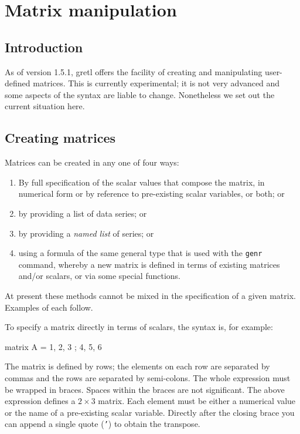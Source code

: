 \chapter{Matrix manipulation}
\label{chap-matrices}

\section{Introduction}
\label{matrix-intro}

As of version 1.5.1, gretl offers the facility of creating and
manipulating user-defined matrices.  This is currently experimental;
it is not very advanced and some aspects of the syntax are liable to
change.  Nonetheless we set out the current situation here.

\section{Creating matrices}
\label{matrix-create}

Matrices can be created in any one of four ways:

\begin{enumerate}
\item By full specification of the scalar values that compose the
  matrix, in numerical form or by reference to pre-existing
  scalar variables, or both; or
\item by providing a list of data series; or
\item by providing a \textit{named list} of series; or
\item using a formula of the same general type that is used
  with the \texttt{genr} command, whereby a new matrix is defined
  in terms of existing matrices and/or scalars, or via some
  special functions.
\end{enumerate}

At present these methods cannot be mixed in the specification of a
given matrix.  Examples of each follow.

To specify a matrix directly in terms of scalars, the syntax is,
for example: 

\begin{code}
matrix A = { 1, 2, 3 ; 4, 5, 6 }
\end{code}

The matrix is defined by rows; the elements on each row are separated
by commas and the rows are separated by semi-colons.  The whole
expression must be wrapped in braces.  Spaces within the braces are
not significant.  The above expression defines a $2\times3$ matrix.
Each element must be either a numerical value or the name of a
pre-existing scalar variable.  Directly after the closing brace you
can append a single quote (\texttt{'}) to obtain the transpose.

